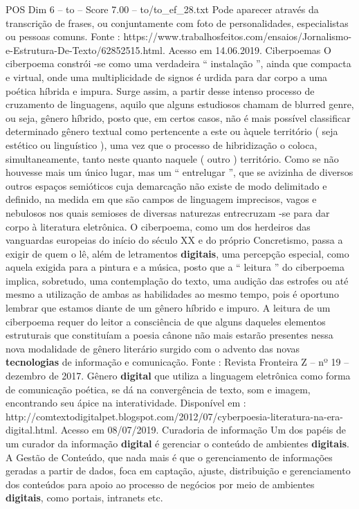 \begin{textsample}{POS Dim 6 – to – Score 7.00 – to/to\_ef\_28.txt}
Pode aparecer através da transcrição de frases, ou conjuntamente com foto de personalidades, especialistas ou pessoas comuns.
Fonte : https://www.trabalhosfeitos.com/ensaios/Jornalismo-e-Estrutura-De-Texto/62852515.html.
Acesso em 14.06.2019.
Ciberpoemas O ciberpoema constrói -se como uma verdadeira “ instalação ”, ainda que compacta e virtual, onde uma multiplicidade de signos é urdida para dar corpo a uma poética híbrida e impura.
Surge assim, a partir desse intenso processo de cruzamento de linguagens, aquilo que alguns estudiosos chamam de blurred genre, ou seja, gênero híbrido, posto que, em certos casos, não é mais possível classificar determinado gênero textual como pertencente a este ou àquele território ( seja estético ou linguístico ), uma vez que o processo de hibridização o coloca, simultaneamente, tanto neste quanto naquele ( outro ) território.
Como se não houvesse mais um único lugar, mas um “ entrelugar ”, que se avizinha de diversos outros espaços semióticos cuja demarcação não existe de modo delimitado e definido, na medida em que são campos de linguagem imprecisos, vagos e nebulosos nos quais semioses de diversas naturezas entrecruzam -se para dar corpo à literatura eletrônica.
O ciberpoema, como um dos herdeiros das vanguardas europeias do início do século XX e do próprio Concretismo, passa a exigir de quem o lê, além de letramentos \textbf{digitais}, uma percepção especial, como aquela exigida para a pintura e a música, posto que a “ leitura ” do ciberpoema implica, sobretudo, uma contemplação do texto, uma audição das estrofes ou até mesmo a utilização de ambas as habilidades ao mesmo tempo, pois é oportuno lembrar que estamos diante de um gênero híbrido e impuro.
A leitura de um ciberpoema requer do leitor a consciência de que alguns daqueles elementos estruturais que constituíam a poesia cânone não mais estarão presentes nessa nova modalidade de gênero literário surgido com o advento das novas \textbf{tecnologias} de informação e comunicação.
Fonte : Revista Fronteira Z – nº 19 – dezembro de 2017.
Gênero \textbf{digital} que utiliza a linguagem eletrônica como forma de comunicação poética, se dá na convergência de texto, som e imagem, encontrando seu ápice na interatividade.
Disponível em : http://comtextodigitalpet.blogspot.com/2012/07/cyberpoesia-literatura-na-era-digital.html.
Acesso em 08/07/2019.
Curadoria de informação Um dos papéis de um curador da informação \textbf{digital} é gerenciar o conteúdo de ambientes \textbf{digitais}.
A Gestão de Conteúdo, que nada mais é que o gerenciamento de informações geradas a partir de dados, foca em captação, ajuste, distribuição e gerenciamento dos conteúdos para apoio ao processo de negócios por meio de ambientes \textbf{digitais}, como portais, intranets etc.

\end{textsample}
